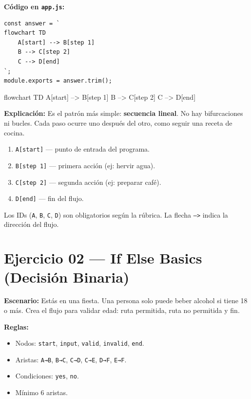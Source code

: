 \documentclass[10pt,a4paper]{article}
\newenvironment{mermaid}[1][]
  {%
   \begin{mdframed}[%
     linecolor=blue!50!black,
     backgroundcolor=blue!3,
     innertopmargin=6pt,
     innerbottommargin=6pt,
     leftmargin=0pt,
     rightmargin=0pt,
     skipabove=10pt,
     skipbelow=10pt,
     frametitle={Diagrama Mermaid},
     frametitlefont={\small\bfseries\color{blue!70!black}},
   ]%
   \small\ttfamily
  }
  {%
   \end{mdframed}%
  }
\begin{document}
\textbf{Código en \texttt{app.js}:}

\begin{lstlisting}[style=jsstyle]
const answer = `
flowchart TD
    A[start] --> B[step 1]
    B --> C[step 2]
    C --> D[end]
`;
module.exports = answer.trim();
\end{lstlisting}

\begin{mermaid}
flowchart TD
    A[start] --> B[step 1]
    B --> C[step 2]
    C --> D[end]
\end{mermaid}

\textbf{Explicación:}
Es el patrón más simple: \textbf{secuencia lineal}. No hay bifurcaciones
ni bucles. Cada paso ocurre uno después del otro, como seguir una
receta de cocina.

\begin{enumerate}
  \item \texttt{A[start]} — punto de entrada del programa.
  \item \texttt{B[step 1]} — primera acción (ej: hervir agua).
  \item \texttt{C[step 2]} — segunda acción (ej: preparar café).
  \item \texttt{D[end]} — fin del flujo.
\end{enumerate}

Los IDs (\texttt{A}, \texttt{B}, \texttt{C}, \texttt{D}) son
obligatorios según la rúbrica. La flecha \texttt{-->} indica la
dirección del flujo.

\newpage

\section{Ejercicio 02 — If Else Basics (Decisión Binaria)}

\textbf{Escenario:} Estás en una fiesta. Una persona solo puede beber
alcohol si tiene 18 o más. Crea el flujo para validar edad: ruta
permitida, ruta no permitida y fin.

\textbf{Reglas:}
\begin{itemize}
  \item Nodos: \texttt{start}, \texttt{input}, \texttt{valid},
        \texttt{invalid}, \texttt{end}.
  \item Aristas: \texttt{A→B}, \texttt{B→C}, \texttt{C→D},
        \texttt{C→E}, \texttt{D→F}, \texttt{E→F}.
  \item Condiciones: \texttt{yes}, \texttt{no}.
  \item Mínimo 6 aristas.
\end{itemize}
\end{document}
